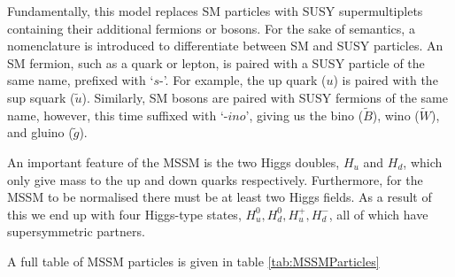 Fundamentally, this model replaces SM particles with SUSY supermultiplets containing their additional fermions or bosons. 
For the sake of semantics, a nomenclature is introduced to differentiate between SM and SUSY particles.
An SM fermion, such as a quark or lepton, is paired with a SUSY particle of the same name, prefixed with `$s$-'. 
For example, the up quark ($u$) is paired with the sup squark ($\tilde{u}$).
Similarly, SM bosons are paired with SUSY fermions of the same name, however, this time suffixed with `-$ino$', giving us the bino ($\tilde{B}$), wino ($\tilde{W}$), and gluino ($\tilde{g}$).

An important feature of the MSSM is the two Higgs doubles, $H_{u}$ and $H_{d}$, which only give mass to the up and down quarks respectively. 
Furthermore, for the MSSM to be normalised there must be at least two Higgs fields.
As a result of this we end up with four Higgs-type states, $H^{0}_{u},  H^{0}_{d}, H^{+}_{u}, H^{-}_{d}$, all of which have supersymmetric partners.

A full table of MSSM particles is given in table \ref{tab:MSSMParticles}

